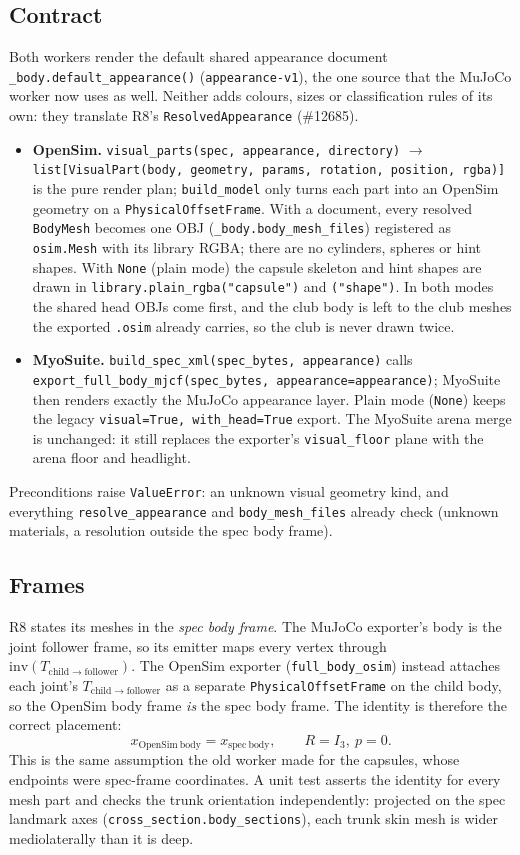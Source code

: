\subsection{Contract}
Both workers render the default shared appearance document
\texttt{\_body.default\_appearance()} (\texttt{appearance-v1}), the one source
that the MuJoCo worker now uses as well. Neither adds colours, sizes or
classification rules of its own: they translate R8's
\texttt{ResolvedAppearance} (\#12685).
\begin{itemize}
\item \textbf{OpenSim.} \texttt{visual\_parts(spec, appearance, directory)}
  $\to$ \texttt{list[VisualPart(body, geometry, params, rotation, position,
  rgba)]} is the pure render plan; \texttt{build\_model} only turns each part
  into an OpenSim geometry on a \texttt{PhysicalOffsetFrame}. With a document,
  every resolved \texttt{BodyMesh} becomes one OBJ (\texttt{\_body.body\_mesh\_files})
  registered as \texttt{osim.Mesh} with its library RGBA; there are no
  cylinders, spheres or hint shapes. With \texttt{None} (plain mode) the
  capsule skeleton and hint shapes are drawn in
  \texttt{library.plain\_rgba("capsule")} and \texttt{("shape")}. In both modes
  the shared head OBJs come first, and the club body is left to the club
  meshes the exported \texttt{.osim} already carries, so the club is never
  drawn twice.
\item \textbf{MyoSuite.} \texttt{build\_spec\_xml(spec\_bytes, appearance)} calls
  \texttt{export\_full\_body\_mjcf(spec\_bytes, appearance=appearance)}; MyoSuite
  then renders exactly the MuJoCo appearance layer. Plain mode (\texttt{None})
  keeps the legacy \texttt{visual=True, with\_head=True} export. The MyoSuite
  arena merge is unchanged: it still replaces the exporter's
  \texttt{visual\_floor} plane with the arena floor and headlight.
\end{itemize}
Preconditions raise \texttt{ValueError}: an unknown visual geometry kind, and
everything \texttt{resolve\_appearance} and \texttt{body\_mesh\_files} already
check (unknown materials, a resolution outside the spec body frame).

\subsection{Frames}
R8 states its meshes in the \emph{spec body frame}. The MuJoCo exporter's body
is the joint follower frame, so its emitter maps every vertex through
$\mathrm{inv}(T_{\mathrm{child\to follower}})$. The OpenSim exporter
(\texttt{full\_body\_osim}) instead attaches each joint's
$T_{\mathrm{child\to follower}}$ as a separate \texttt{PhysicalOffsetFrame} on
the child body, so the OpenSim body frame \emph{is} the spec body frame. The
identity is therefore the correct placement:
\[
  x_{\mathrm{OpenSim\ body}} = x_{\mathrm{spec\ body}}, \qquad
  R = I_3,\ p = 0 .
\]
This is the same assumption the old worker made for the capsules, whose
endpoints were spec-frame coordinates. A unit test asserts the identity for
every mesh part and checks the trunk orientation independently: projected on
the spec landmark axes (\texttt{cross\_section.body\_sections}), each trunk skin
mesh is wider mediolaterally than it is deep.

